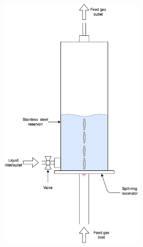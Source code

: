 \begin{figure}
    \centering
    \begin{subfigure}[b]{0.475\textwidth}
        \centering
        \includegraphics[width=0.8\textwidth]{chapter_6/figures/upside_down_reactor_schematic.png}
        \caption{}
        \label{fig:upside_down_reactor_schematic}
    \end{subfigure}
    \hfill
    \begin{subfigure}[b]{0.475\textwidth}  
        \centering 

\end{subfigure}
\end{figure}
